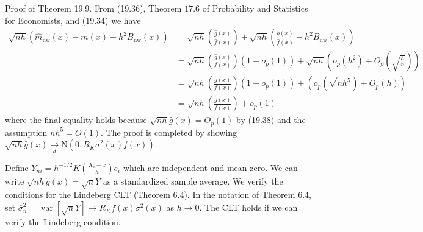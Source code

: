 \documentclass[10pt]{article}
\begin{document}
Proof of Theorem 19.9. From (19.36), Theorem $17.6$ of Probability and Statistics for Economists, and (19.34) we have
$$
\begin{aligned}
\sqrt{n h}\left(\widehat{m}_{\mathrm{nw}}(x)-m(x)-h^{2} B_{\mathrm{nw}}(x)\right) &=\sqrt{n h}\left(\frac{\widehat{g}(x)}{\widehat{f}(x)}\right)+\sqrt{n h}\left(\frac{\widehat{b}(x)}{\widehat{f}(x)}-h^{2} B_{\mathrm{nw}}(x)\right) \\
&=\sqrt{n h}\left(\frac{\widehat{g}(x)}{f(x)}\right)\left(1+o_{p}(1)\right)+\sqrt{n h}\left(o_{p}\left(h^{2}\right)+O_{p}\left(\sqrt{\frac{h}{n}}\right)\right) \\
&=\sqrt{n h}\left(\frac{\widehat{g}(x)}{f(x)}\right)\left(1+o_{p}(1)\right)+\left(o_{p}\left(\sqrt{n h^{5}}\right)+O_{p}(h)\right) \\
&=\sqrt{n h}\left(\frac{\widehat{g}(x)}{f(x)}\right)+o_{p}(1)
\end{aligned}
$$
where the final equality holds because $\sqrt{n h} \widehat{g}(x)=O_{p}(1)$ by (19.38) and the assumption $n h^{5}=O(1)$. The proof is completed by showing $\sqrt{n h} \widehat{g}(x) \underset{d}{\longrightarrow} \mathrm{N}\left(0, R_{K} \sigma^{2}(x) f(x)\right)$.

Define $Y_{n i}=h^{-1 / 2} K\left(\frac{X_{i}-x}{h}\right) e_{i}$ which are independent and mean zero. We can write $\sqrt{n h} \widehat{g}(x)=\sqrt{n} \bar{Y}$ as a standardized sample average. We verify the conditions for the Lindeberg CLT (Theorem 6.4). In the notation of Theorem 6.4, set $\bar{\sigma}_{n}^{2}=\operatorname{var}[\sqrt{n} \bar{Y}] \rightarrow R_{K} f(x) \sigma^{2}(x)$ as $h \rightarrow 0$. The CLT holds if we can verify the Lindeberg condition.
\end{document}
